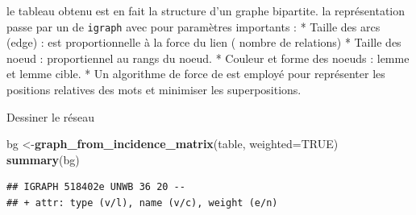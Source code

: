 \documentclass[
]{book}
\newenvironment{Shaded}{\begin{snugshade}}{\end{snugshade}}
\newcommand{\CommentTok}[1]{\textcolor[rgb]{0.56,0.35,0.01}{\textit{#1}}}
\newcommand{\DataTypeTok}[1]{\textcolor[rgb]{0.13,0.29,0.53}{#1}}
\newcommand{\DecValTok}[1]{\textcolor[rgb]{0.00,0.00,0.81}{#1}}
\newcommand{\FloatTok}[1]{\textcolor[rgb]{0.00,0.00,0.81}{#1}}
\newcommand{\KeywordTok}[1]{\textcolor[rgb]{0.13,0.29,0.53}{\textbf{#1}}}
\newcommand{\NormalTok}[1]{#1}
\newcommand{\OperatorTok}[1]{\textcolor[rgb]{0.81,0.36,0.00}{\textbf{#1}}}
\newcommand{\OtherTok}[1]{\textcolor[rgb]{0.56,0.35,0.01}{#1}}
\newcommand{\StringTok}[1]{\textcolor[rgb]{0.31,0.60,0.02}{#1}}
\begin{document}
le tableau obtenu est en fait la structure d'un graphe bipartite. la représentation passe par un de \texttt{igraph} avec pour paramètres importants :
* Taille des arcs (edge) : est proportionnelle à la force du lien ( nombre de relations)
* Taille des noeud : proportiennel au rangs du noeud.
* Couleur et forme des noeuds : lemme et lemme cible.
* Un algorithme de force de \citet{fruchterman_graph_1991} est employé pour représenter les positions relatives des mots et minimiser les superpositions.

Dessiner le réseau

\begin{Shaded}
\begin{Highlighting}[]
\NormalTok{bg <-}\KeywordTok{graph_from_incidence_matrix}\NormalTok{(table, }\DataTypeTok{weighted=}\OtherTok{TRUE}\NormalTok{)}
\KeywordTok{summary}\NormalTok{(bg)}
\end{Highlighting}
\end{Shaded}

\begin{verbatim}
## IGRAPH 518402e UNWB 36 20 -- 
## + attr: type (v/l), name (v/c), weight (e/n)
\end{verbatim}

\begin{Shaded}
\end{Shaded}
\end{document}
